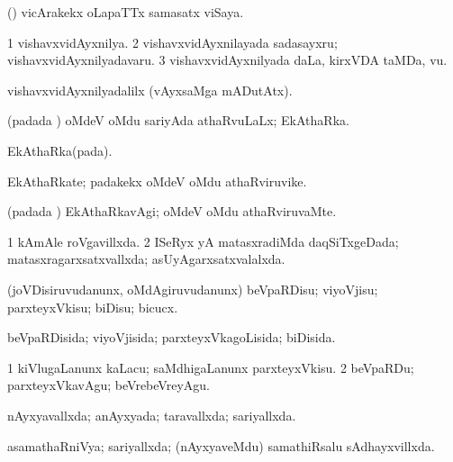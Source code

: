 {{\noindent
\gl{\pagu}
\expl{}
\bmng
{} (\takaR) vicArakekx oLapaTTx samasatx viSaya. 
\emng
\eentry

\bentry
{} 
\gl{\nA}
\bmng
\bnum
\num{1} vishavxvidAyxnilya. 
\num{2} vishavxvidAyxnilayada sadasayxru; vishavxvidAyxnilyadavaru. 
\num{3} vishavxvidAyxnilyada daLa, kirxVDA taMDa, \mo vu. 
\enum
\emng

\noindent 
\gl{\pagu}
\expl{}
\bmng
{} vishavxvidAyxnilyadalilx (vAyxsaMga mADutAtx). 
\emng
\eentry

\bentry
{} 
\gl{\gu}
\expl{}
\bmng
(padada \vi) oMdeV oMdu sariyAda athaRvuLaLx; EkAthaRka. 
\emng
\eentry

\bentry
{} 
\gl{\nA}
\expl{}
\bmng
EkAthaRka(pada). 
\emng
\eentry

\bentry
{} 
\gl{\nA}
\expl{}
\bmng
EkAthaRkate; padakekx oMdeV oMdu athaRviruvike. 
\emng
\eentry

\bentry
{} 
\gl{\kirxvi}
\expl{}
\bmng
(padada \vi) EkAthaRkavAgi; oMdeV oMdu athaRviruvaMte. 
\emng
\eentry

\bentry
{} 
\gl{\gu}
\expl{}
\bmng
\bnum
\num{1} kAmAle roVgavillxda. 
\num{2} ISeRyx yA matasxradiMda daqSiTxgeDada; matasxragarxsatxvallxda; asUyAgarxsatxvalalxda. 
\enum
\emng
\eentry

\bentry
{} 
\gl{\sakirx}
\expl{}
\bmng
(joVDisiruvudanunx, oMdAgiruvudanunx) beVpaRDisu; viyoVjisu; parxteyxVkisu; biDisu; bicucx. 
\emng
\eentry

\bentry
{} 
\gl{\gu}
\expl{}
\bmng
beVpaRDisida; viyoVjisida; parxteyxVkagoLisida; biDisida. 
\emng
\eentry

\bentry
{} 
\gl{\sakirx}
\expl{}
\bmng
\bnum
\num{1} kiVlugaLanunx kaLacu; saMdhigaLanunx parxteyxVkisu. 
\num{2} beVpaRDu; parxteyxVkavAgu; beVrebeVreyAgu. 
\enum
\emng
\eentry

\bentry
{} 
\gl{\gu}
\expl{}
\bmng
nAyxyavallxda; anAyxyada; taravallxda; sariyallxda. 
\emng
\eentry

\bentry
{} 
\gl{\gu}
\expl{}
\bmng
asamathaRniVya; sariyallxda; (nAyxyaveMdu) samathiRsalu sAdhayxvillxda. 
\emng
\eentry

}}
